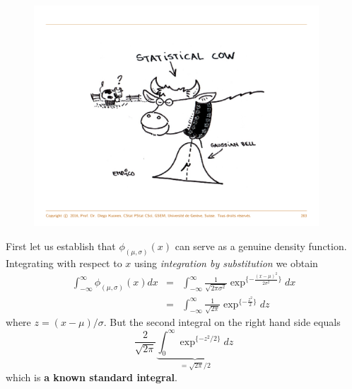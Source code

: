 \documentclass[notes=show,smaller,handout]{beamer}\usepackage[]{graphicx}\usepackage[]{color}
\begin{document}
\begin{frame}{\subsecname}
  \begin{figure}[ptb]\centering
  \includegraphics[width=0.95\textwidth,height=0.75\textheight]{img/Cow.pdf}%
  \end{figure}
\end{frame}

\begin{frame}{\subsecname}

  First let us establish that $\phi_{(\mu,\sigma)}(x)$ can serve as a
  genuine density function. Integrating with respect to $x$ using
  \textit{integration by substitution} we obtain
  \begin{eqnarray*}
  \int_{-\infty}^{\infty}\phi_{(\mu,\sigma)}(x)dx&=&
  \int_{-\infty}^{\infty}\frac{1}{\sqrt{2\pi\sigma^2}}\exp^{\{-\frac{(x-\mu)^2}{2\sigma^2}\}}dx
  \\
   &=&\int_{-\infty}^{\infty}\frac{1}{\sqrt{2\pi}}\exp^{\{-\frac{z^2}{2}\}}dz
  \end{eqnarray*}
  where $z=(x-\mu)/\sigma$. But the second integral on the right
  hand side equals
  $$
  \frac{2}{\sqrt{2\pi}}\underbrace{\int_0^{\infty}\exp^{\{-z^2/2\}}dz}_{={\sqrt{2\pi}} \big/ {2}}
  $$
  which is \textbf{a known standard integral}.
\end{frame}
\end{document}
